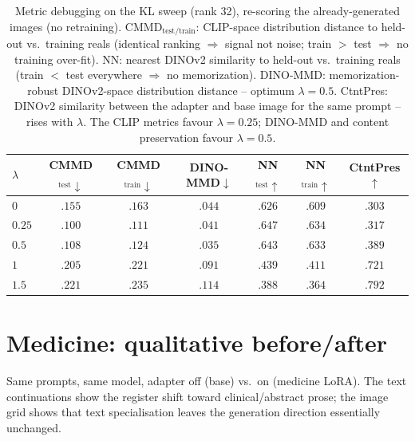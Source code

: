 \documentclass{article}
\begin{document}
\begin{table}[h]
\centering\small
\setlength{\tabcolsep}{5pt}
\begin{tabular}{lcccccc}
\toprule
$\lambda$ & CMMD$_{\text{test}}\downarrow$ & CMMD$_{\text{train}}\downarrow$ & DINO-MMD$\downarrow$ & NN$_{\text{test}}\uparrow$ & NN$_{\text{train}}\uparrow$ & CtntPres$\uparrow$ \\
\midrule
$0$    & $.155$ & $.163$ & $.044$ & $.626$ & $.609$ & $.303$ \\
$0.25$ & $\mathbf{.100}$ & $.111$ & $.041$ & $.647$ & $.634$ & $.317$ \\
$0.5$  & $.108$ & $.124$ & $\mathbf{.035}$ & $.643$ & $.633$ & $.389$ \\
$1$    & $.205$ & $.221$ & $.091$ & $.439$ & $.411$ & $.721$ \\
$1.5$  & $.221$ & $.235$ & $.114$ & $.388$ & $.364$ & $.792$ \\
\bottomrule
\end{tabular}
\caption{Metric debugging on the KL sweep (rank 32), re-scoring the
already-generated images (no retraining). CMMD$_{\text{test/train}}$: CLIP-space
distribution distance to held-out vs.\ training reals (identical ranking $\Rightarrow$
signal not noise; train $>$ test $\Rightarrow$ no training over-fit). NN: nearest
DINOv2 similarity to held-out vs.\ training reals (train $<$ test everywhere
$\Rightarrow$ no memorization). DINO-MMD: memorization-robust DINOv2-space
distribution distance -- optimum $\lambda{=}0.5$. CtntPres: DINOv2 similarity
between the adapter and base image for the same prompt -- rises with $\lambda$. The
CLIP metrics favour $\lambda{=}0.25$; DINO-MMD and content preservation favour
$\lambda{=}0.5$.}
\label{tab:metric-debug}
\end{table}

\clearpage
\section{Medicine: qualitative before/after}
\label{app:medicine}
Same prompts, same model, adapter off (base) vs.\ on (medicine LoRA). The text
continuations show the register shift toward clinical/abstract prose; the image
grid shows that text specialisation leaves the generation direction essentially
unchanged.
\end{document}
